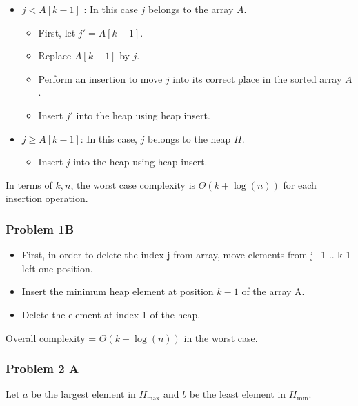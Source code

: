 \documentclass[
]{article}
\providecommand{\tightlist}{%
  \setlength{\itemsep}{0pt}\setlength{\parskip}{0pt}}
\begin{document}
\begin{itemize}
\tightlist
\item
  \(j < A[k-1]\) : In this case \(j\) belongs to the array \(A\).

  \begin{itemize}
  \tightlist
  \item
    First, let \(j' = A[k-1]\).
  \item
    Replace \(A[k-1]\) by \(j\).
  \item
    Perform an insertion to move \(j\) into its correct place in the
    sorted array \(A\).
  \item
    Insert \(j'\) into the heap using heap insert.
  \end{itemize}
\item
  \(j \geq A[k-1]\): In this case, \(j\) belongs to the heap \(H\).

  \begin{itemize}
  \tightlist
  \item
    Insert \(j\) into the heap using heap-insert.
  \end{itemize}
\end{itemize}

In terms of \(k, n\), the worst case complexity is
\(\Theta(k + \log(n))\) for each insertion operation.

\hypertarget{problem-1b}{%
\subsubsection{Problem 1B}\label{problem-1b}}

\begin{itemize}
\tightlist
\item
  First, in order to delete the index j from array, move elements from
  j+1 .. k-1 left one position.
\item
  Insert the minimum heap element at position \(k-1\) of the array A.
\item
  Delete the element at index 1 of the heap.
\end{itemize}

Overall complexity = \(\Theta(k + \log(n))\) in the worst case.

\hypertarget{problem-2-a}{%
\subsubsection{Problem 2 A}\label{problem-2-a}}

Let \(a\) be the largest element in \(H_{\max}\) and \(b\) be the least
element in \(H_{\min}\).
\end{document}
